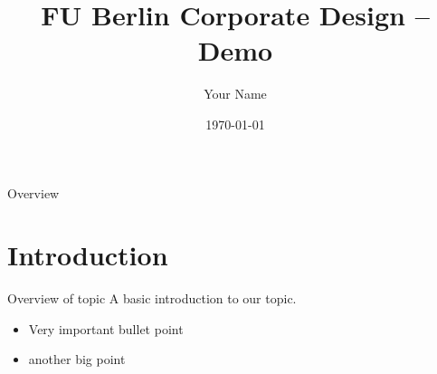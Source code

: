 \documentclass{beamer}
\title[Demo]{FU Berlin Corporate Design – Demo}
\author[Initials]{Your Name}
\institute{Institute for Computer Science}
\date{\today}
\begin{document}

\begin{frame}
  \titlepage
\end{frame}

\begin{frame}{Overview}
  \tableofcontents
\end{frame}


\section{Introduction}

\begin{frame}{Overview of topic}
A basic introduction to our topic.
\begin{itemize}
  \item Very important bullet point
  \item another big point
\end{itemize}
\end{frame}
\end{document}
